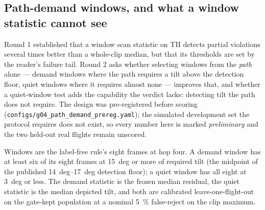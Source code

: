
\subsection{Path-demand windows, and what a window statistic cannot see}
\label{sec:g2-path-demand}

Round 1 established that a window scan statistic on TII detects partial violations several times
better than a whole-clip median, but that its thresholds are set by the reader's failure tail.
Round 2 asks whether selecting windows from the \emph{path} alone --- demand windows where the
path requires a tilt above the detection floor, quiet windows where it requires almost none ---
improves that, and whether a quiet-window test adds the capability the verdict lacks: detecting
tilt the path does not require. The design was pre-registered before scoring
(\texttt{configs/g04\_path\_demand\_prereg.yaml}); the simulated development set the protocol
requires does not exist, so every number here is marked \emph{preliminary} and the two held-out
real flights remain unscored.

Windows are the label-free rule's eight frames at hop four. A demand window has at least six of
its eight frames at \SI{15}{deg} or more of required tilt (the midpoint of the published
\SIrange{14}{17}{deg} detection floor); a quiet window has all eight at \SI{3}{deg} or less. The
demand statistic is the frozen median residual, the quiet statistic is the median depicted tilt,
and both are calibrated leave-one-flight-out on the gate-kept population at a nominal
\SI{5}{\percent} false-reject on the clip maximum.

